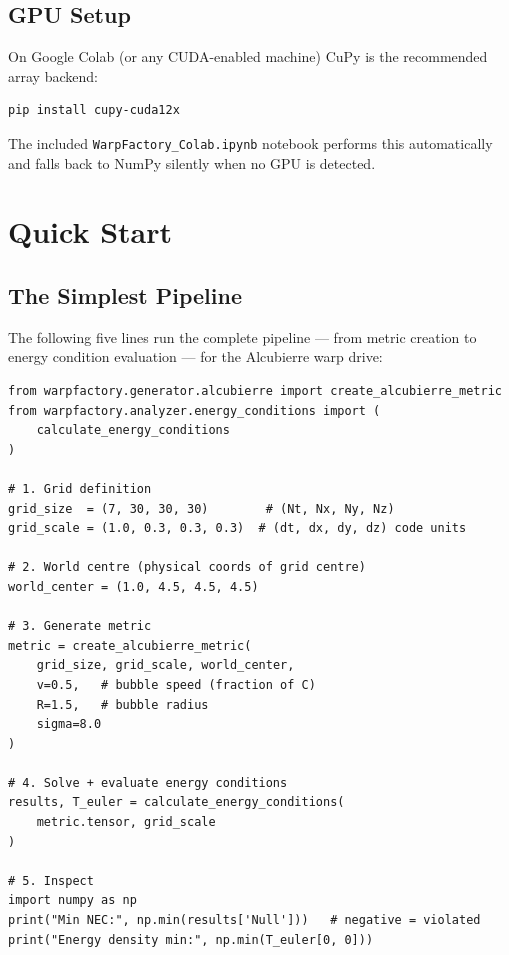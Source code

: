 \documentclass[11pt, a4paper, twoside]{report}
\begin{document}
\section{GPU Setup}

On Google Colab (or any CUDA-enabled machine) CuPy is the recommended
array backend:

\begin{lstlisting}[caption={Install CuPy on Colab (CUDA 12)}]
pip install cupy-cuda12x
\end{lstlisting}

The included \texttt{WarpFactory\_Colab.ipynb} notebook performs this
automatically and falls back to NumPy silently when no GPU is detected.

\chapter{Quick Start}
\label{chap:quickstart}

\section{The Simplest Pipeline}

The following five lines run the complete pipeline — from metric creation
to energy condition evaluation — for the Alcubierre warp drive:

\begin{lstlisting}[caption={Minimal Alcubierre example}]
from warpfactory.generator.alcubierre import create_alcubierre_metric
from warpfactory.analyzer.energy_conditions import (
    calculate_energy_conditions
)

# 1. Grid definition
grid_size  = (7, 30, 30, 30)        # (Nt, Nx, Ny, Nz)
grid_scale = (1.0, 0.3, 0.3, 0.3)  # (dt, dx, dy, dz) code units

# 2. World centre (physical coords of grid centre)
world_center = (1.0, 4.5, 4.5, 4.5)

# 3. Generate metric
metric = create_alcubierre_metric(
    grid_size, grid_scale, world_center,
    v=0.5,   # bubble speed (fraction of C)
    R=1.5,   # bubble radius
    sigma=8.0
)

# 4. Solve + evaluate energy conditions
results, T_euler = calculate_energy_conditions(
    metric.tensor, grid_scale
)

# 5. Inspect
import numpy as np
print("Min NEC:", np.min(results['Null']))   # negative = violated
print("Energy density min:", np.min(T_euler[0, 0]))
\end{lstlisting}
\end{document}
